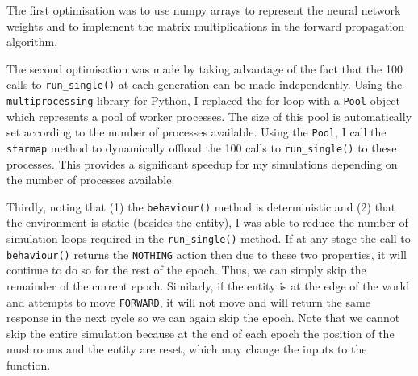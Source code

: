 \documentclass[12pt,a4paper,twoside,openright]{report}
\begin{document}
The first optimisation was to use numpy arrays to represent the neural network weights and to implement the matrix multiplications in the forward propagation algorithm. 

The second optimisation was made by taking advantage of the fact that the 100 calls to \texttt{run\_single()} at each generation can be made independently. Using the \texttt{multiprocessing} library for Python, I replaced the for loop with a \texttt{Pool} object which represents a pool of worker processes. The size of this pool is automatically set according to the number of processes available. Using the \texttt{Pool}, I call the \texttt{starmap} method to dynamically offload the 100 calls to \texttt{run\_single()} to these processes. This provides a significant speedup for my simulations depending on the number of processes available. 


Thirdly, noting that (1) the \texttt{behaviour()} method is deterministic and (2) that the environment is static (besides the entity), I was able to reduce the number of simulation loops required in the \texttt{run\_single()} method. If at any stage the call to \texttt{behaviour()} returns the \texttt{NOTHING} action then due to these two properties, it will continue to do so for the rest of the epoch. Thus, we can simply skip the remainder of the current epoch. Similarly, if the entity is at the edge of the world and attempts to move \texttt{FORWARD}, it will not move and will return the same response in the next cycle so we can again skip the epoch. Note that we cannot skip the entire simulation because at the end of each epoch the position of the mushrooms and the entity are reset, which may change the inputs to the function.
\end{document}
